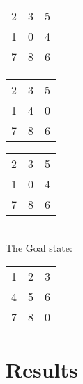 \documentclass{article}
\begin{document}
\begin{table}[!htb]
\begin{subtable}{.1\linewidth}
\begin{tabular}{ccc |}
        \end{tabular}
    \end{subtable} 
    \begin{subtable}{.1\linewidth}
      \centering
        \begin{tabular}{ccc |}
2 & 3 & 5 \\
1 & 0 & 4 \\
7 & 8 & 6 \\
        \end{tabular}
    \end{subtable} 
    \begin{subtable}{.1\linewidth}
      \centering
        \begin{tabular}{ccc |}
2 & 3 & 5 \\
1 & 4 & 0 \\
7 & 8 & 6 \\
        \end{tabular}
    \end{subtable} 
   \begin{subtable}{.1\linewidth}
      \centering
        \begin{tabular}{ccc}
2 & 3 & 5 \\
1 & 0 & 4 \\
7 & 8 & 6 \\
        \end{tabular}
    \end{subtable}
\end{table}
\\
The Goal state:
\begin{table}[!htb]
    \begin{subtable}{.1\linewidth}
      \centering
        \begin{tabular}{ccc}
1 & 2 & 3 \\
4 & 5 & 6 \\
7 & 8 & 0 \\
        \end{tabular}

    \end{subtable}%

\end{table}

\section{Results}
\end{document}
